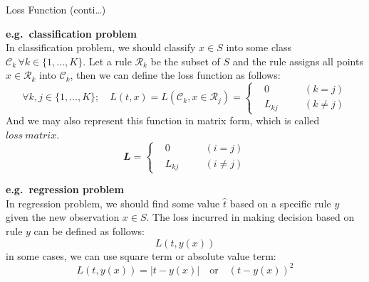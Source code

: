 \documentclass{bredelebeamer}
\begin{document}
\begin{frame}{Loss Function (conti\ldots)}
  \begin{justify}
    \textbf{e.g.\ classification problem}\\
    In classification problem, we should classify $x \in S$ into some class
    $\mathcal{C}_k \, \forall k \in \{ 1,\ldots,K \}$. Let a rule $\mathcal{R}_k$
    be the subset of $S$ and the rule assigns all points $x \in \mathcal{R}_k$
    into $\mathcal{C}_k$, then we can define the loss function as follows:
    \begin{equation}
       \forall k,j \in \{ 1,\ldots,K \}; \quad
       L(t, x) = L(\mathcal{C}_{k}, x \in \mathcal{R}_j)
        = \left\{\begin{aligned}
          & 0       \quad && (k = j)  \\
          & L_{kj}  \quad && (k \neq j)
        \end{aligned}\right.
    \end{equation}
    And we may also represent this function in matrix form, which is called
    $\mathit{loss\ matrix}$.
    \begin{equation}
      \mathbfit{L}
        = \left\{\begin{aligned}
          & 0       \quad && (i = j)  \\
          & L_{kj}  \quad && (i \neq j)
        \end{aligned}\right.
    \end{equation}

    \vspace{0.5\baselineskip}
    \textbf{e.g.\ regression problem}\\
    In regression problem, we should find some value $\hat{t}$ based on a specific
    rule $y$ given the new observation $x \in S$. The loss incurred in making decision
    based on rule $y$ can be defined as follows:
    \begin{equation}
      L(t, y(x))
    \end{equation}
    in some cases, we can use square term or absolute value term:
    \begin{equation}
      L(t, y(x)) = |t-y(x)| \quad \textrm{or} \quad {(t-y(x))}^2
    \end{equation}
  \end{justify}
\end{frame}
\end{document}
